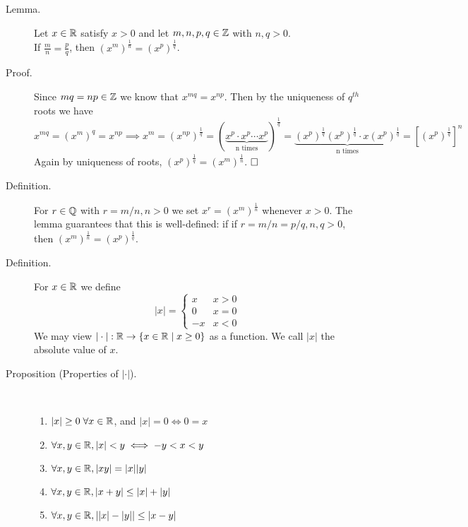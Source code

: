\documentclass[letterpaper,11pt]{article}
\begin{document}
\begin{description}
\item[Lemma.] Let $x\in\mathbb{R}$ satisfy $x>0$ and let $m,n,p,q\in\mathbb{Z}$ with $n,q>0$.\\
    If $\frac{m}{n}=\frac{p}{q}$, then $(x^m)^\frac{1}{n}=(x^p)^\frac{1}{q}$.
\item[Proof.] Since $mq=np\in\mathbb{Z}$ we know that $x^{mq}=x^{np}$. Then by the
    uniqueness of $q^{th}$ roots we have
    \newcommand{\xpq}{(x^p)^\frac{1}{q}}
    \[
    x^{mq}=(x^m)^q=x^{np}\implies x^m=(x^{np})^\frac{1}{q}
    =(\underbrace{x^p\cdot x^p\cdots x^p}_\text{n times})^\frac{1}{q}
    =\underbrace{\xpq\xpq\cdot x\xpq}_\text{n times}
    =\left[(x^p)^\frac{1}{q}\right]^n
    \]
    Again by uniqueness of roots, $(x^p)^\frac{1}{q}=(x^m)^\frac{1}{n}$.
    $\hfill\square$


\item[Definition.] For $r\in\mathbb{Q}$ with $r=m/n,n>0$ we set $x^r=(x^m)^\frac{1}{n}$
    whenever $x>0$. The lemma guarantees that this is well-defined: if
    if $r=m/n=p/q, n,q>0$, then $(x^m)^\frac{1}{n}=(x^p)^\frac{1}{q}$.

\item[Definition.] For $x\in\mathbb{R}$ we define
  \[
  |x| = \begin{cases}
        x & x>0\\
        0 & x=0\\
        -x & x<0
        \end{cases}
  \]
  We may view $|\cdot|:\mathbb{R}\rightarrow\{x\in\mathbb{R}\;|\;x\ge0\}$ as a function.
  We call $|x|$ the absolute value of $x$.


\item[Proposition (Properties of $|\cdot|$).]\text{}\vspace{-0.2in}\\
  \begin{enumerate}
  \item $|x|\ge0\;\forall x\in\mathbb{R}$, and $|x|=0\iff0=x$
  \item $\forall x,y\in\mathbb{R}, |x|<y\iff -y<x<y$
  \item $\forall x,y\in\mathbb{R}, |xy|=|x||y|$
  \item $\forall x,y\in\mathbb{R}, |x+y|\le|x|+|y|$
  \item $\forall x,y\in\mathbb{R}, ||x|-|y||\le|x-y|$ %
  \end{enumerate}
\end{description}
\end{document}
